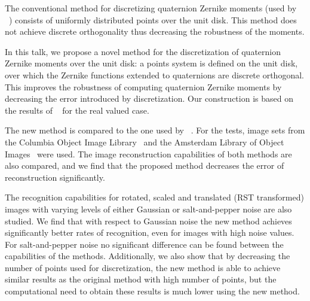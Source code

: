 \documentclass[10pt,a4paper,twoside]{article}
\begin{document}
The conventional method for discretizing quaternion Zernike moments (used by \citeauthor{qzmi}~\cite{qzmi}) consists of uniformly distributed points over the unit disk. This method does not achieve discrete orthogonality thus decreasing the robustness of the moments. 

In this talk, we propose a novel method for the discretization of quaternion Zernike moments over the unit disk: a points system is defined on the unit disk, over which the Zernike functions extended to quaternions are discrete orthogonal. This improves the robustness of computing quaternion Zernike moments by decreasing the error introduced by discretization. Our construction is based on the results of \citeauthor{schipp}~\cite{schipp} for the real valued case. 

The new method is compared to the one used by \citeauthor{qzmi}~\cite{qzmi}. For the tests, image sets from the Columbia Object Image Library~\cite{coil} and the Amsterdam Library of Object Images~\cite{aloi} were used. 
The image reconstruction capabilities of both methods are also compared, and we find that the proposed method decreases the error of reconstruction significantly.

The recognition capabilities for rotated, scaled and translated (RST transformed) images with varying levels of either Gaussian or salt-and-pepper noise are also studied. We find that with respect to Gaussian noise the new method achieves significantly better rates of recognition, even for images with high noise values. For salt-and-pepper noise no significant difference can be found between the capabilities of the methods.
Additionally, we also show that by decreasing the number of points used for discretization, the new method is able to achieve similar results as the original method with high number of points, but the computational need to obtain these results is much lower using the new method.

%
%

{}
%
%
\end{document}
